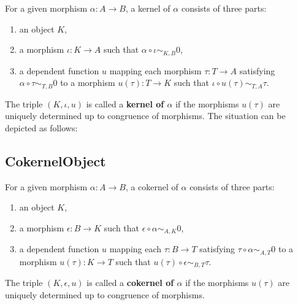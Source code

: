 \begin{definition}
  For a given morphism $\alpha: A \rightarrow B$, a kernel of $\alpha$ consists of three parts:
 \begin{enumerate}
  \item an object $K$,
  \item a morphism $\iota: K \rightarrow A$ such that $\alpha \circ \iota \sim_{K,B} 0$,
  \item a dependent function $u$ mapping each morphism $\tau: T \rightarrow A$ satisfying $\alpha \circ \tau \sim_{T,B} 0$ to
  a morphism $u(\tau): T \rightarrow K$ such that $\iota \circ u( \tau ) \sim_{T,A} \tau$. 
 \end{enumerate}
 The triple $( K, \iota, u )$ is called a \textbf{kernel of $\alpha$} if the morphisms $u( \tau )$ are uniquely determined up to
 congruence of morphisms. The situation can be depicted as follows:
 
 \begin{center}
\end{center}
\end{definition}

\subsection{CokernelObject}

\begin{definition}
 For a given morphism $\alpha: A \rightarrow B$, a cokernel of $\alpha$ consists of three parts:
 \begin{enumerate}
  \item an object $K$,
  \item a morphism $\epsilon: B \rightarrow K$ such that $\epsilon \circ \alpha \sim_{A,K} 0$,
  \item a dependent function $u$ mapping each $\tau: B \rightarrow T$ satisfying $\tau \circ \alpha \sim_{A, T} 0$
        to a morphism $u(\tau):K \rightarrow T$ such that $u(\tau) \circ \epsilon \sim_{B,T} \tau$.
 \end{enumerate}
  The triple $( K, \epsilon, u )$ is called a \textbf{cokernel of $\alpha$} if the morphisms $u( \tau )$ are uniquely determined up to
 congruence of morphisms.
\end{definition}

